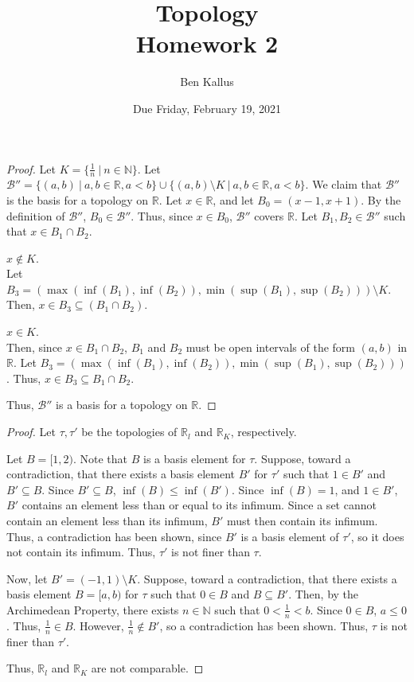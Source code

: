 \documentclass{article}
\date{Due Friday, February 19, 2021}
\author{Ben Kallus}
\title{Topology \\ Homework 2}
\newcommand{\R}{\mathbb R}
\newcommand{\N}{\mathbb N}
\newcommand{\B}{\mathcal B}
\begin{document}
\pagecolor{black}
\color{white}
\maketitle

\begin{proof}
    Let $K = \{\frac1n ~|~ n \in \N\}$.
    Let $\B'' = \{(a,b) ~|~ a,b \in \R, a < b\} \cup \{(a,b) \setminus K ~|~ a,b \in \R, a < b\}$.
    We claim that $\B''$ is the basis for a topology on $\R$.
    Let $x \in \R$, and let $B_0 = (x-1,x+1)$.
    By the definition of $\B''$, $B_0 \in \B''$.
    Thus, since $x \in B_0$, $\B''$ covers $\R$.
    Let $B_1, B_2 \in \B''$ such that $x \in B_1 \cap B_2$.
    
     $x \notin K$. \\
    \indent
    Let $B_3 = (\max(\inf(B_1), \inf(B_2)), \min(\sup(B_1), \sup(B_2))) \setminus K$.
    Then, $x \in B_3 \subseteq (B_1 \cap B_2)$.
    
     $x \in K$. \\
    \indent
    Then, since $x \in B_1 \cap B_2$, $B_1$ and $B_2$ must be open intervals of the form $(a,b)$ in $\R$.
    Let $B_3 = (\max(\inf(B_1), \inf(B_2)), \min(\sup(B_1), \sup(B_2)))$.
    Thus, $x \in B_3 \subseteq B_1 \cap B_2$.

    Thus, $\B''$ is a basis for a topology on $\R$.
\end{proof}

\bigskip
{}
\begin{proof}
    Let $\tau, \tau'$ be the topologies of $\R_l$ and $\R_K$, respectively.

    Let $B = [1, 2)$.
    Note that $B$ is a basis element for $\tau$.
    Suppose, toward a contradiction, that there exists a basis element $B'$ for $\tau'$ such that $1 \in B'$ and $B' \subseteq B$.
    Since $B' \subseteq B$, $\inf(B) \leq \inf(B')$.
    Since $\inf(B) = 1$, and $1 \in B'$, $B'$ contains an element less than or equal to its infimum.
    Since a set cannot contain an element less than its infimum, $B'$ must then contain its infimum.
    Thus, a contradiction has been shown, since $B'$ is a basis element of $\tau'$, so it does not contain its infimum.
    Thus, $\tau'$ is not finer than $\tau$.

    Now, let $B' = (-1,1) \setminus K$.
    Suppose, toward a contradiction, that there exists a basis element $B = [a,b)$ for $\tau$ such that $0 \in B$ and $B \subseteq B'$.
    Then, by the Archimedean Property, there exists $n \in \N$ such that $0 < \frac1n < b$.
    Since $0 \in B$, $a \leq 0$.
    Thus, $\frac1n \in B$.
    However, $\frac1n \notin B'$, so a contradiction has been shown.
    Thus, $\tau$ is not finer than $\tau'$.

    Thus, $\R_l$ and $\R_K$ are not comparable.
\end{proof}
\end{document}
